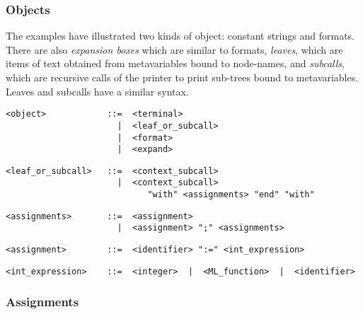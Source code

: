 \subsubsection{Objects}

The examples have illustrated two kinds of object: constant strings and
formats. There are also {\it expansion boxes\/} which are similar to formats,
{\it leaves}, which are items of text obtained from metavariables bound to
node-names, and {\it subcalls}, which are recursive calls of the printer to
print sub-trees bound to metavariables. Leaves and subcalls have a similar
syntax.

\begin{small}\begin{verbatim}
<object>            ::=  <terminal>
                      |  <leaf_or_subcall>
                      |  <format>
                      |  <expand>
\end{verbatim}\end{small}

\begin{small}\begin{verbatim}
<leaf_or_subcall>   ::=  <context_subcall>
                      |  <context_subcall>
                            "with" <assignments> "end" "with"
\end{verbatim}\end{small}

\begin{small}\begin{verbatim}
<assignments>       ::=  <assignment>
                      |  <assignment> ";" <assignments>
\end{verbatim}\end{small}

\begin{small}\begin{verbatim}
<assignment>        ::=  <identifier> ":=" <int_expression>
\end{verbatim}\end{small}

\begin{small}\begin{verbatim}
<int_expression>    ::=  <integer>  |  <ML_function>  |  <identifier>
\end{verbatim}\end{small}


\subsubsection{Assignments}

